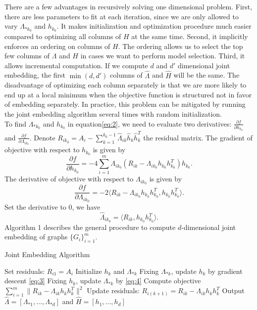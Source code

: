 \documentclass[10pt,journal,compsoc]{IEEEtran}
\begin{document}
\noindent There are a few advantages in recursively solving one dimensional problem. First, there are less parameters to fit at each iteration, since we are only allowed to vary $\Lambda_{*k_0}$ and $h_{k_0}$. It makes initialization and optimization procedure much easier compared to optimizing all columns of $H$ at the same time. Second, it implicitly enforces an ordering on columns of $H$. The ordering allows us to select the top few columns of $\Lambda$ and $H$ in cases we want to perform model selection. Third, it allows incremental computation. If we compute $d$ and $d'$ dimensional joint embedding, the first $\min(d,d')$ columns of $\hat{\Lambda}$ and $\hat{H}$ will be the same. The disadvantage of optimizing each column separately is that we are more likely to end up at a local minimum when the objective function is structured not in favor of embedding separately. In practice, this problem can be mitigated by running the joint embedding algorithm several times with random initialization. \\ 

\noindent To find $\Lambda_{*k_0}$ and $h_{k_0}$ in equation\ref{eq:2}, we need to evaluate two derivatives: $\frac{\partial f}{\partial h_{k_0}}$ and $\frac{\partial f}{\partial \Lambda_{i k_0}}$. Denote $R_{ik_0}=A_i- \sum\limits_{k=1}^{k_0-1}\hat{\Lambda}_{ik} \hat{h}_{k} \hat{h}_{k}^T$ the residual matrix. The gradient of objective with respect to $h_{k_0}$ is given by
\begin{equation} \label{eq:3}
\frac{\partial f}{\partial h_{k_0}} = -4\sum\limits_{i=1}^{m}  \Lambda_{ik_0} (R_{ik}-\Lambda_{ik_0} h_{k_0} h_{k_0}^T)  h_{k_0}.
\end{equation}
The derivative of objective with respect to $\Lambda_{i k_0}$ is given by
\[\frac{\partial f}{\partial \Lambda_{i k_0}}= -2 \langle R_{ik}-\Lambda_{ik_0} h_{k_0} h_{k_0}^T,h_{k_0} h_{k_0}^T\rangle.\]
Set the derivative to $0$, we have
\begin{equation}  \label{eq:4}
\hat{\Lambda}_{i k_0} = \langle R_{ik}, h_{k_0} h_{k_0}^T \rangle.
\end{equation}
Algorithm 1 describes the general procedure to compute $d$-dimensional joint embedding of graphs $\{G_i\}_{i=1}^m$. 

\begin{algorithm}
	\caption{Joint Embedding Algorithm}
	\begin{algorithmic}[1]
		\State Set residuals: $R_{i1}=A_i$
		\State Initialize $h_k$ and $\Lambda_{*k}$ 
		\State Fixing $\Lambda_{*k}$, update $h_k$ by gradient descent \eqref{eq:3}
		\State Fixing $h_k$, update $\Lambda_{*k}$ by \eqref{eq:4}
		\State Compute objective $\sum\limits_{i=1}^{m} \| R_{ik}-  \Lambda_{ik} h_k h_k^T \|^2$
		\EndWhile
		\State Update residuals: $R_{i(k+1)}=R_{ik}- \Lambda_{ik} h_kh_k^T$
		\EndFor
		\State Output $\hat{\Lambda}=[\Lambda_{*1},...,\Lambda_{*d}]$ and $\hat{H}=[h_1,...,h_d]$
		\EndProcedure
	\end{algorithmic}
\end{algorithm}
\end{document}
